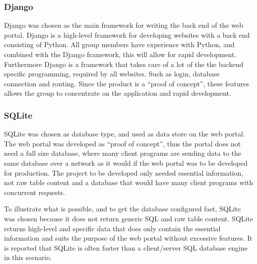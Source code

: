 \subsubsection{Django}
\label{django}
Django \cite{django} was chosen as the main framework for writing the back end of the web portal. Django is a high-level framework for developing websites with a back end consisting of Python. All group members have experience with Python, and combined with the Django framework, this will allow for rapid development. Furthermore Django is a framework that takes care of a lot of the the backend specific programming, required by all websites. Such as login, database connection and routing. Since the product is a “proof of concept”, these features allows the group to concentrate on the application and rapid development.  

\subsubsection{SQLite}
SQLite\cite{SQLite} was chosen as database type, and used as data store on the web portal. The web portal was developed as “proof of concept”, thus the portal does not need a full size database, where many client programs are sending data to the same database over a network as it would if the web portal was to be developed for production. The project to be developed only needed essential information, not raw table content and a database that would have many client programs with concurrent requests. 

To illustrate what is possible, and to get the database configured fast, SQLite was chosen because it does not return generic SQL and raw table content. SQLite returns high-level and specific data that does only contain the essential information and suits the purpose of the web portal without excessive features. It is reported that SQLite is often faster than a client/server SQL database engine in this scenario. \cite{Server-sideDatabase} 


\cleardoublepage